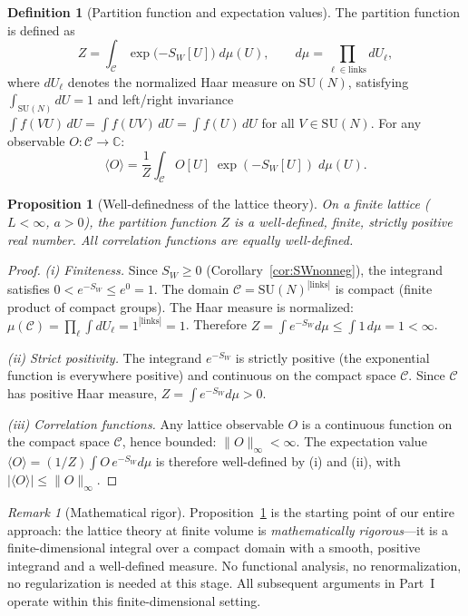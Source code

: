 \documentclass[12pt,a4paper]{article}
\theoremstyle{plain}
\newtheorem{proposition}[theorem]{Proposition}
\theoremstyle{definition}
\newtheorem{definition}[theorem]{Definition}
\theoremstyle{remark}
\newtheorem{remark}[theorem]{Remark}
\begin{document}
\begin{definition}[Partition function and expectation values]\label{def:Z}
The partition function is defined as
\begin{equation}\label{eq:Z}
Z = \int_{\mathcal{C}} \exp\!\big({-S_W[U]}\big)\;d\mu(U), \qquad d\mu = \prod_{\ell\in\mathrm{links}} dU_\ell,
\end{equation}
where $dU_\ell$ denotes the normalized Haar measure on $\mathrm{SU}(N)$, satisfying $\int_{\mathrm{SU}(N)} dU=1$ and left/right invariance $\int f(VU)\,dU=\int f(UV)\,dU=\int f(U)\,dU$ for all $V\in\mathrm{SU}(N)$. For any observable $O:\mathcal{C}\to\mathbb{C}$:
\begin{equation}
\langle O \rangle = \frac{1}{Z}\int_{\mathcal{C}} O[U]\;\exp({-S_W[U]})\;d\mu(U).
\end{equation}
\end{definition}

\begin{proposition}[Well-definedness of the lattice theory]\label{prop:wd}
On a finite lattice ($L<\infty$, $a>0$), the partition function $Z$ is a well-defined, finite, strictly positive real number. All correlation functions are equally well-defined.
\end{proposition}

\begin{proof}
\textit{(i) Finiteness.} Since $S_W\geq 0$ (Corollary~\ref{cor:SWnonneg}), the integrand satisfies $0<e^{-S_W}\leq e^0=1$. The domain $\mathcal{C}=\mathrm{SU}(N)^{|\mathrm{links}|}$ is compact (finite product of compact groups). The Haar measure is normalized: $\mu(\mathcal{C})=\prod_\ell\int dU_\ell=1^{|\mathrm{links}|}=1$. Therefore $Z=\int e^{-S_W}d\mu\leq\int 1\,d\mu=1<\infty$.

\textit{(ii) Strict positivity.} The integrand $e^{-S_W}$ is strictly positive (the exponential function is everywhere positive) and continuous on the compact space $\mathcal{C}$. Since $\mathcal{C}$ has positive Haar measure, $Z=\int e^{-S_W}d\mu>0$.

\textit{(iii) Correlation functions.} Any lattice observable $O$ is a continuous function on the compact space $\mathcal{C}$, hence bounded: $\|O\|_\infty<\infty$. The expectation value $\langle O\rangle=(1/Z)\int O\,e^{-S_W}d\mu$ is therefore well-defined by (i) and (ii), with $|\langle O\rangle|\leq\|O\|_\infty$.
\end{proof}

\begin{remark}[Mathematical rigor]
Proposition~\ref{prop:wd} is the starting point of our entire approach: the lattice theory at finite volume is \emph{mathematically rigorous}---it is a finite-dimensional integral over a compact domain with a smooth, positive integrand and a well-defined measure. No functional analysis, no renormalization, no regularization is needed at this stage. All subsequent arguments in Part~I operate within this finite-dimensional setting.
\end{remark}
\end{document}
